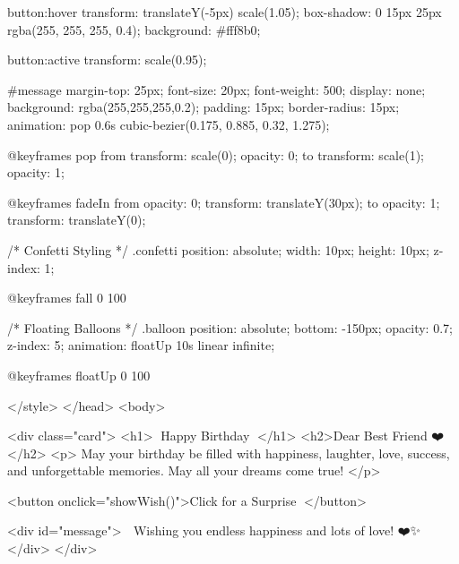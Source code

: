         button:hover {
            transform: translateY(-5px) scale(1.05);
            box-shadow: 0 15px 25px rgba(255, 255, 255, 0.4);
            background: #fff8b0;
        }

        button:active {
            transform: scale(0.95);
        }

        #message {
            margin-top: 25px;
            font-size: 20px;
            font-weight: 500;
            display: none;
            background: rgba(255,255,255,0.2);
            padding: 15px;
            border-radius: 15px;
            animation: pop 0.6s cubic-bezier(0.175, 0.885, 0.32, 1.275);
        }

        @keyframes pop {
            from { transform: scale(0); opacity: 0; }
            to { transform: scale(1); opacity: 1; }
        }

        @keyframes fadeIn {
            from { opacity: 0; transform: translateY(30px); }
            to { opacity: 1; transform: translateY(0); }
        }

        /* Confetti Styling */
        .confetti {
            position: absolute;
            width: 10px;
            height: 10px;
            z-index: 1;
        }

        @keyframes fall {
            0%
            100%
        }

        /* Floating Balloons */
        .balloon {
            position: absolute;
            bottom: -150px;
            opacity: 0.7;
            z-index: 5;
            animation: floatUp 10s linear infinite;
        }

        @keyframes floatUp {
            0%
            100%
        }

    </style>
</head>
<body>

    <div class="card">
        <h1>🎉 Happy Birthday 🎉</h1>
        <h2>Dear Best Friend ❤️</h2>
        <p>
            May your birthday be filled with happiness, laughter, 
            love, success, and unforgettable memories. 
            May all your dreams come true!
        </p>
        
        <button onclick="showWish()">Click for a Surprise 🎁</button>

        <div id="message">
            🎈 Wishing you endless happiness and lots of love! ❤️✨
        </div>
    </div>

